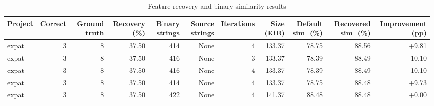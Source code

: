 \begin{table}[htbp]
\centering
\caption{Feature-recovery and binary-similarity results}
\label{tab:feature-recovery-results}
\small
\begin{tabular}{lrrrrrrrrrr}
\toprule
Project & Correct & Ground truth & Recovery (\%) & Binary strings & Source strings & Iterations & Size (KiB) & Default sim. (\%) & Recovered sim. (\%) & Improvement (pp) \\
\midrule
expat & 3 & 8 & 37.50 & 414 & None & 4 & 133.37 & 78.75 & 88.56 & +9.81 \\
expat & 3 & 8 & 37.50 & 416 & None & 3 & 133.37 & 78.39 & 88.49 & +10.10 \\
expat & 3 & 8 & 37.50 & 416 & None & 4 & 133.37 & 78.39 & 88.49 & +10.10 \\
expat & 3 & 8 & 37.50 & 414 & None & 4 & 133.37 & 78.75 & 88.48 & +9.73 \\
expat & 3 & 8 & 37.50 & 422 & None & 4 & 141.37 & 88.48 & 88.48 & +0.00 \\
\bottomrule
\end{tabular}
\end{table}
